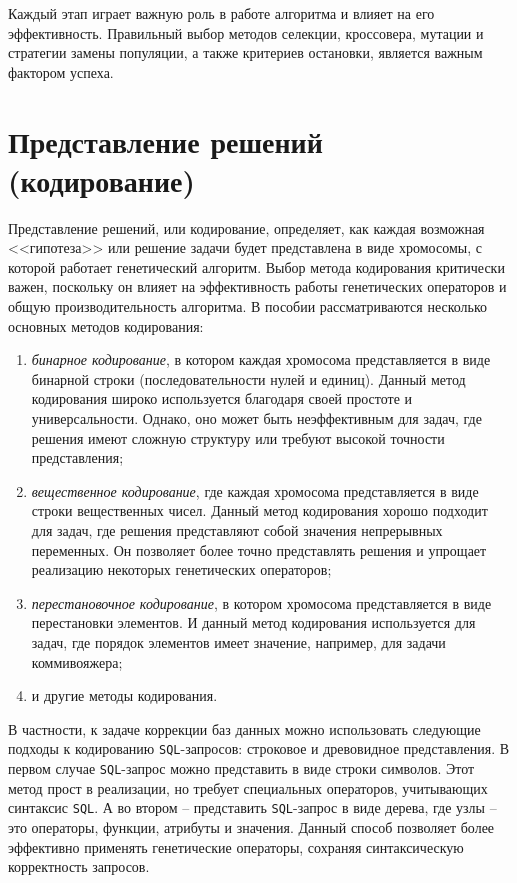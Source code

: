 \documentclass[master,paper]{pmk-graduate}
\begin{document}
Каждый этап играет важную роль в работе алгоритма и влияет на его эффективность. Правильный выбор методов селекции, кроссовера, мутации и стратегии замены популяции, а также критериев остановки, является важным фактором успеха.

\section{Представление решений (кодирование)}
\label{sec13} 

Представление решений, или кодирование, определяет, как каждая возможная <<гипотеза>> или решение задачи будет представлена в виде хромосомы, с которой работает генетический алгоритм. Выбор метода кодирования критически важен, поскольку он влияет на эффективность работы генетических операторов и общую производительность алгоритма. В пособии рассмат\-риваются несколько основных методов кодирования:

\begin{enumerate}
	\item \textit{бинарное кодирование}, в котором каждая хромосома представляется в виде бинарной строки (последовательности нулей и единиц). Данный метод кодирования широко используется благодаря своей простоте и универсальности. Однако, оно может быть неэффективным для задач, где решения имеют сложную структуру или требуют высокой точности представления;
	\item \textit{вещественное кодирование}, где каждая хромосома представляется в виде строки вещественных чисел. Данный метод кодирования хорошо подходит для задач, где решения представляют собой значения непрерывных переменных. Он позволяет более точно представлять решения и упрощает реализацию некоторых генетических операторов;
	\item \textit{перестановочное кодирование}, в котором хромосома представ\-ляется в виде перестановки элементов. И данный метод кодирования использует\-ся для задач, где порядок элементов имеет значение, например, для задачи коммивояжера;
	\item и другие методы кодирования.
\end{enumerate}

В частности, к задаче коррекции баз данных можно использовать следующие подходы к кодированию \texttt{SQL}-запросов: строковое и древовидное предс\-тавления. В первом случае \texttt{SQL}-запрос можно представить в виде строки символов. Этот метод прост в реализации, но требует специальных операторов, учитывающих синтаксис \texttt{SQL}. А во втором -- представить \texttt{SQL}-запрос в виде дерева, где узлы -- это операторы, функции, атрибуты и значения. Данный способ позволяет более эффективно применять генетические операторы, сохраняя синтаксическую корректность запросов.
\end{document}
